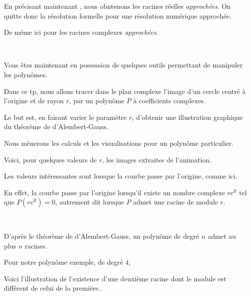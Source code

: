   
\change
En précisant maintenant , nous obntenons les racines réelles \emph{approchées}.
  On quitte donc la résolution formelle
    pour une résolution numérique approchée.
    
  
\change    
De même ici pour les racines complexes \emph{approchées}.        

~

Vous êtes maintenant en possession de quelques outils permettant de manipuler les polynômes.





\diapo

Dans ce tp, nous allons tracer dans le plan complexe l'image d'un cercle centré à l'origine et de rayon $r$, 
par un polynôme $P$ à coefficients complexes.

\change
Le but est, en faisant varier le paramètre $r$, d'obtenir une illustration graphique du théorème de d'Alembert-Gauss.

\change
Nous mènerons les calculs et les visualisations pour un polynôme particulier.

\diapo

Voici, pour quelques valeurs de $r$, les images extraites de l'animation.


\change

Les valeurs intéressantes sont lorsque la courbe passe par l'origine, comme ici.

En effet, la courbe passe par l'origine
lorsqu'il existe un nombre complexe $re^{\ii t}$ tel que $P(re^{\ii t}) = 0$, autrement dit lorsque 
$P$ admet une racine de module $r$.

~

 D'après le théorème de d'Alembert-Gauss, un polynôme de degré $n$ admet au plus
$n$ racines. 


Pour notre polynôme exemple, de degré $4$, 

\change
Voici l'illustration de l'existence d'une deuxième racine dont le module est différent de celui de la première..

